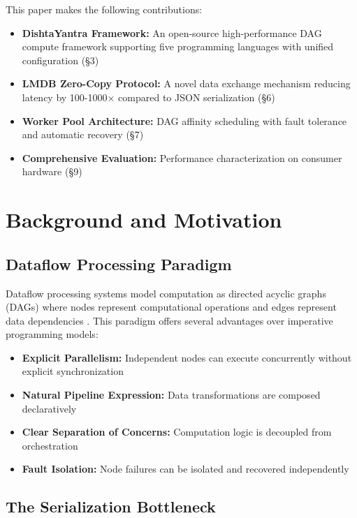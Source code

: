 \documentclass[11pt,a4paper]{article}
\begin{document}
This paper makes the following contributions:

\begin{itemize}
    \item \textbf{DishtaYantra Framework:} An open-source high-performance DAG compute framework supporting five programming languages with unified configuration (\S3)
    \item \textbf{LMDB Zero-Copy Protocol:} A novel data exchange mechanism reducing latency by 100-1000$\times$ compared to JSON serialization (\S6)
    \item \textbf{Worker Pool Architecture:} DAG affinity scheduling with fault tolerance and automatic recovery (\S7)
    \item \textbf{Comprehensive Evaluation:} Performance characterization on consumer hardware (\S9)
\end{itemize}

\section{Background and Motivation}

\subsection{Dataflow Processing Paradigm}

Dataflow processing systems model computation as directed acyclic graphs (DAGs) where nodes represent computational operations and edges represent data dependencies \cite{johnston2004advances}. This paradigm offers several advantages over imperative programming models:

\begin{itemize}
    \item \textbf{Explicit Parallelism:} Independent nodes can execute concurrently without explicit synchronization
    \item \textbf{Natural Pipeline Expression:} Data transformations are composed declaratively
    \item \textbf{Clear Separation of Concerns:} Computation logic is decoupled from orchestration
    \item \textbf{Fault Isolation:} Node failures can be isolated and recovered independently
\end{itemize}

\subsection{The Serialization Bottleneck}
\end{document}
